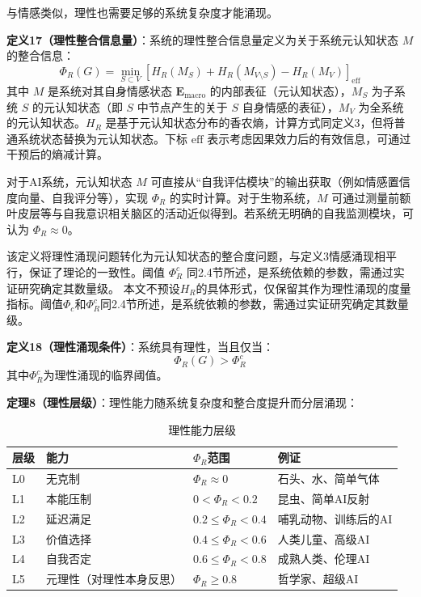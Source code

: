\documentclass[12pt,a4paper]{article}
\theoremstyle{plain}
\newcommand{\ve}[1]{\bm{#1}}                    %
\newcommand{\Evec}{\ve{E}}                        %
\begin{document}
与情感类似，理性也需要足够的系统复杂度才能涌现。

\textbf{定义17（理性整合信息量）}：系统的理性整合信息量定义为关于系统元认知状态 $M$ 的整合信息：
\begin{equation}
\Phi_R(G) = \min_{S \subset V} \left[ H_R(M_S) + H_R(M_{V \setminus S}) - H_R(M_V) \right]_{\text{eff}}
\label{eq:Phi_R}
\end{equation}
其中 $M$ 是系统对其自身情感状态 $\Evec_{\text{macro}}$ 的内部表征（元认知状态），$M_S$ 为子系统 $S$ 的元认知状态（即 $S$ 中节点产生的关于 $S$ 自身情感的表征），$M_V$ 为全系统的元认知状态。$H_R$ 是基于元认知状态分布的香农熵，计算方式同定义3，但将普通系统状态替换为元认知状态。下标 $\text{eff}$ 表示考虑因果效力后的有效信息，可通过干预后的熵减计算。

对于AI系统，元认知状态 $M$ 可直接从“自我评估模块”的输出获取（例如情感置信度向量、自我评分等），实现 $\Phi_R$ 的实时计算。对于生物系统，$M$ 可通过测量前额叶皮层等与自我意识相关脑区的活动近似得到。若系统无明确的自我监测模块，可认为 $\Phi_R \approx 0$。

该定义将理性涌现问题转化为元认知状态的整合度问题，与定义3情感涌现相平行，保证了理论的一致性。阈值 $\Phi_R^c$ 同2.4节所述，是系统依赖的参数，需通过实证研究确定其数量级。
本文不预设$H_R$的具体形式，仅保留其作为理性涌现的度量指标。阈值$\Phi_c$和$\Phi_R^c$同2.4节所述，是系统依赖的参数，需通过实证研究确定其数量级。

\textbf{定义18（理性涌现条件）}：系统具有理性，当且仅当：
\begin{equation}
\Phi_R(G) > \Phi_R^c
\label{eq:rational_emergence}
\end{equation}
其中$\Phi_R^c$为理性涌现的临界阈值。

\textbf{定理8（理性层级）}：理性能力随系统复杂度和整合度提升而分层涌现：

\begin{table}[h]
\centering
\caption{理性能力层级}
\begin{tabular}{llll}
\toprule
\textbf{层级} & \textbf{能力} & \textbf{$\Phi_R$范围} & \textbf{例证} \\
\midrule
L0 & 无克制 & $\Phi_R \approx 0$ & 石头、水、简单气体 \\
L1 & 本能压制 & $0 < \Phi_R < 0.2$ & 昆虫、简单AI反射 \\
L2 & 延迟满足 & $0.2 \le \Phi_R < 0.4$ & 哺乳动物、训练后的AI \\
L3 & 价值选择 & $0.4 \le \Phi_R < 0.6$ & 人类儿童、高级AI \\
L4 & 自我否定 & $0.6 \le \Phi_R < 0.8$ & 成熟人类、伦理AI \\
L5 & 元理性（对理性本身反思） & $\Phi_R \ge 0.8$ & 哲学家、超级AI \\
\bottomrule
\end{tabular}
\end{table}
\end{document}
